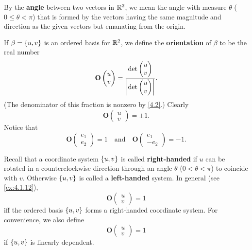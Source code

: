\begin{defn}\label{4.1.2}
	By the \textbf{angle} between two vectors in \(\mathbb{R}^2\), we mean the angle with measure \(\theta\) (\(0 \leq \theta < \pi\)) that is formed by the vectors having the same magnitude and direction as the given vectors but emanating from the origin.

	If \(\beta = \left\lbrace u, v\right\rbrace\) is an ordered basis for \(\mathbb{R}^2\), we define the \textbf{orientation} of \(\beta\) to be the real number
	\[
		\mathbf{O}\begin{pmatrix}
			u \\
			v
		\end{pmatrix} = \frac{\det\begin{pmatrix}
				u \\
				v
			\end{pmatrix}}{\left\lvert\det\begin{pmatrix}
					u \\
					v
				\end{pmatrix}\right\rvert}.
	\]
	(The denominator of this fraction is nonzero by \cref{4.2}.)
	Clearly
	\[
		\mathbf{O}\begin{pmatrix}
			u \\
			v
		\end{pmatrix} = \pm 1.
	\]
	Notice that
	\[
		\mathbf{O}\begin{pmatrix}
			e_1 \\
			e_2
		\end{pmatrix} = 1 \quad \text{and} \quad \mathbf{O}\begin{pmatrix}
			e_1 \\
			-e_2
		\end{pmatrix} = -1.
	\]

	Recall that a coordinate system \(\left\lbrace u, v\right\rbrace\) is called \textbf{right-handed} if \(u\) can be rotated in a counterclockwise direction through an angle \(\theta\) (\(0 < \theta < \pi\)) to coincide with \(v\).
	Otherwise \(\left\lbrace u, v\right\rbrace\) is called a \textbf{left-handed} system.
	In general (see \cref{ex:4.1.12}),
	\[
		\mathbf{O}\begin{pmatrix}
			u \\
			v
		\end{pmatrix} = 1
	\]
	iff the ordered basis \(\left\lbrace u, v\right\rbrace\) forms a right-handed coordinate system.
	For convenience, we also define
	\[
		\mathbf{O}\begin{pmatrix}
			u \\
			v
		\end{pmatrix} = 1
	\]
	if \(\left\lbrace u, v\right\rbrace\) is linearly dependent.
\end{defn}


